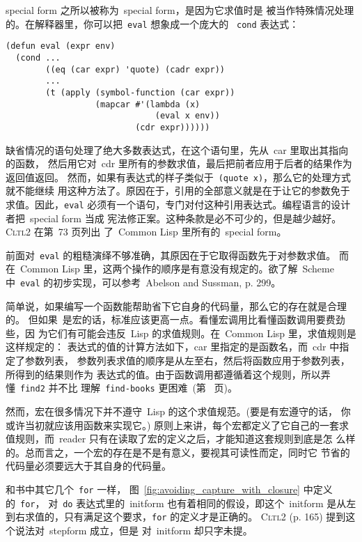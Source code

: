 \begin{notes}
  special form 之所以被称为~special form，是因为它求值时是
  被当作特殊情况处理的。在解释器里，你可以把~\texttt{eval} 想象成一个庞大的
  ~\texttt{cond} 表达式：
\begin{verbatim}
(defun eval (expr env)
  (cond ...
        ((eq (car expr) 'quote) (cadr expr))
        ...
        (t (apply (symbol-function (car expr))
                  (mapcar #'(lambda (x)
                              (eval x env))
                          (cdr expr))))))
\end{verbatim}
  缺省情况的语句处理了绝大多数表达式，在这个语句里，先从~car 里取出其指向的函数，
  然后用它对~cdr 里所有的参数求值，最后把前者应用于后者的结果作为返回值返回。
  然而，如果有表达式的样子类似于~\texttt{(quote x)}，那么它的处理方式就不能继续
  用这种方法了。原因在于，引用的全部意义就是在于让它的参数免于求值。因此，\texttt{eval} 
  必须有一个语句，专门对付这种引用表达式。编程语言的设计者把~special form 当成
  宪法修正案。这种条款是必不可少的，但是越少越好。\textsc{Cltl}2 在第~73 页列出
  了~Common Lisp 里所有的~special form。
  
  前面对~\texttt{eval} 的粗糙演绎不够准确，其原因在于它取得函数先于对参数求值。
  而在~Common Lisp 里，这两个操作的顺序是有意没有规定的。欲了解~Scheme 中~\texttt{eval}
  的初步实现，可以参考~Abelson and Sussman, p. 299。

  简单说，如果编写一个\utility{}函数能帮助省下它自身的代码量，那么它的存在就是合理的。
  但如果~\utility{}是宏的话，标准应该更高一点。看懂宏调用比看懂函数调用要费劲些，因
  为它们有可能会违反~Lisp 的求值规则。在~Common Lisp 里，求值规则是这样规定的：
  表达式的值的计算方法如下，car 里指定的是函数名，而~cdr 中指定了参数列表，
  参数列表求值的顺序是从左至右，然后将函数应用于参数列表，所得到的结果则作为
  表达式的值。由于函数调用都遵循着这个规则，所以弄懂~\texttt{find2} 并不比
  理解~\texttt{find-books} 更困难~(第~\pageref{func:find-books} 页)。

  然而，宏在很多情况下并不遵守~Lisp 的这个求值规范。(要是有宏遵守的话，
  你或许当初就应该用函数来实现它。) 原则上来讲，每个宏都定义了它自己的一套求
  值规则，而~reader 只有在读取了宏的定义之后，才能知道这套规则到底是怎
  么样的。总而言之，一个宏的存在是不是有意义，要视其可读性而定，同时它
  节省的代码量必须要远大于其自身的代码量。



  和书中其它几个~\texttt{for} 一样，
  图~\ref{fig:avoiding_capture_with_closure} 中定义的~\texttt{for}，
  对~\texttt{do} 表达式里的~initform 也有着相同的假设，即这个~initform
  是从左到右求值的，只有满足这个要求，\texttt{for} 的定义才是正确的。
  \textsc{Cltl}2 (p. 165) 提到这个说法对~stepform 成立，但是
  对~initform 却只字未提。


\end{notes}
